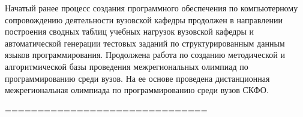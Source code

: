 

%
%







Начатый ранее процесс создания программного обеспечения по компьютерному сопровождению деятельности вузовской кафедры продолжен в направлении построения сводных таблиц учебных нагрузок вузовской кафедры и автоматической генерации тестовых заданий по структурированным данным языков программирования.
Продолжена работа по созданию методической и алгоритмической базы проведения межрегиональных олимпиад по программированию среди вузов. На ее основе проведена дистанционная межрегиональная олимпиада по программированию среди вузов СКФО.






===============================





































